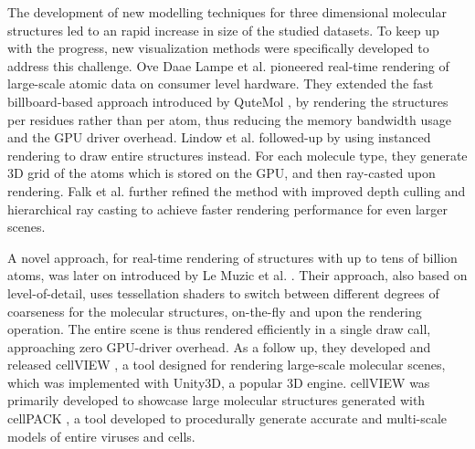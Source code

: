 \documentclass[review,journal]{vgtc}         %
\begin{document}
The development of new modelling techniques for three dimensional molecular structures led to an rapid increase in size of the studied datasets.
To keep up with the progress, new visualization methods were specifically developed to address this challenge.
Ove Daae Lampe et al.\cite{lampe2007two} pioneered real-time rendering of large-scale atomic data on consumer level hardware. 
They extended the fast billboard-based approach introduced by QuteMol \cite{tarini2006ambient}, by rendering the structures per residues rather than per atom, thus reducing the memory bandwidth usage and the GPU driver overhead. 
Lindow et al. \cite{lindow2012interactive} followed-up by using  instanced rendering to draw entire structures instead.
For each molecule type, they generate 3D grid of the atoms which is stored on the GPU, and then ray-casted upon rendering.
Falk et al. \cite{falk2013atomistic} further refined the method with improved depth culling and hierarchical ray casting to achieve faster rendering performance for even larger scenes. 


A novel approach, for real-time rendering of structures with up to tens of billion atoms, was later on introduced by Le Muzic et al. \cite{le2014illustrative}. 
Their approach, also based on level-of-detail, uses tessellation shaders to switch between different degrees of coarseness for the molecular structures, on-the-fly and upon the rendering operation.
The entire scene is thus rendered efficiently in a single draw call, approaching zero GPU-driver overhead. 
As a follow up, they developed and released cellVIEW \cite{muzic2015cellview}, a tool designed for rendering large-scale molecular scenes, which was implemented with Unity3D, a popular 3D engine.
cellVIEW was primarily developed to showcase large molecular structures generated with cellPACK \cite{johnson2015cellpack}, a tool developed to procedurally generate accurate and multi-scale models of entire viruses and cells.
\end{document}
